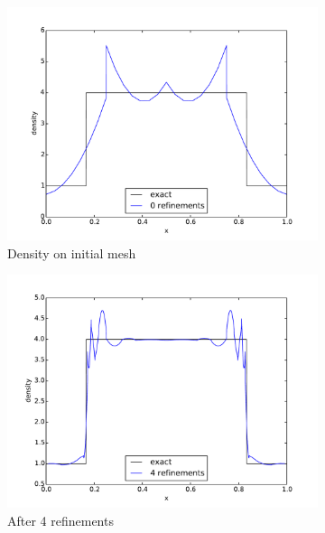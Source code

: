 \documentclass[preprint,12pt]{elsarticle}
\begin{document}
\begin{figure}[p]
\centering
\begin{subfigure}[c]{0.3\textwidth}
\centering
\includegraphics[width=\textwidth]{SpaceTimeCNS/Noh1e-3/den1.pdf}
\caption{Density on initial mesh}
\label{fig:noh_den0}
\end{subfigure}
\begin{subfigure}[c]{0.3\textwidth}
\centering
\includegraphics[width=\textwidth]{SpaceTimeCNS/Noh1e-3/den5.pdf}
\caption{After 4 refinements}
\label{fig:noh_den4}
\end{subfigure}
\begin{subfigure}[c]{0.3\textwidth}
\centering

\end{subfigure}
\end{figure}
\end{document}
